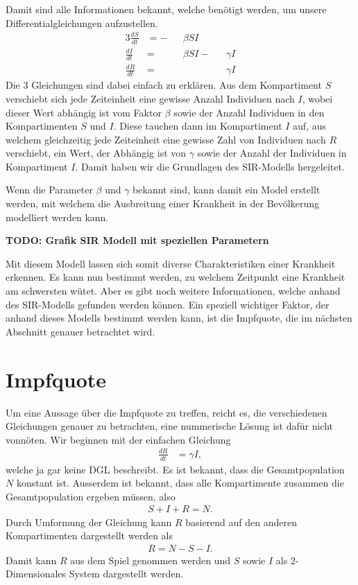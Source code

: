 \begin{refsection}
Damit sind alle Informationen bekannt, welche benötigt werden, um unsere Differentialgleichungen aufzustellen. 
\begin{alignat*}{3}
  \frac{dS}{dt} & = - && \beta S I  \\
  \frac{dI}{dt} & =   && \beta S I - && \gamma I \\
  \frac{dR}{dt} & =   &&             && \gamma I 
\end{alignat*}
Die 3 Gleichungen sind dabei einfach zu erklären. 
Aus dem Kompartiment $S$ verschiebt sich jede Zeiteinheit eine gewisse Anzahl Individuen nach $I$, wobei dieser Wert abhängig ist vom Faktor $\beta$ sowie der Anzahl Individuen in den Kompartimenten $S$ und $I$.
Diese tauchen dann im Kompartiment $I$ auf, aus welchem gleichzeitig jede Zeiteinheit eine gewisse Zahl von Individuen nach $R$ verschiebt, ein Wert, der Abhängig ist von $\gamma$ sowie der Anzahl der Individuen in Kompartiment $I$. 
Damit haben wir die Grundlagen des SIR-Modells hergeleitet. 

Wenn die Parameter $\beta$ und $\gamma$ bekannt sind, kann damit ein Model erstellt werden, mit welchem die Ausbreitung einer Krankheit in der Bevölkerung modelliert werden kann.

\textbf{TODO: Grafik SIR Modell mit speziellen Parametern}

Mit diesem Modell lassen sich somit diverse Charakteristiken einer Krankheit erkennen. 
Es kann nun bestimmt werden, zu welchem Zeitpunkt eine Krankheit am schwersten wütet. 
Aber es gibt noch weitere Informationen, welche anhand des SIR-Modells gefunden werden können.
Ein speziell wichtiger Faktor, der anhand dieses Modells bestimmt werden kann, ist die Impfquote, die im nächsten Abschnitt genauer betrachtet wird.

\section{Impfquote}
Um eine Aussage über die Impfquote zu treffen, reicht es, die verschiedenen Gleichungen genauer zu betrachten, eine nummerische Lösung ist dafür nicht vonnöten.
Wir beginnen mit der einfachen Gleichung
\begin{align*}
  \frac{dR}{dt} &= \gamma I,
\end{align*}
welche ja gar keine DGL beschreibt. 
Es ist bekannt, dass die Gesamtpopulation $N$ konstant ist. 
Ausserdem ist bekannt, dass alle Kompartimente zusammen die Gesamtpopulation ergeben müssen, also
\begin{align*}
  S + I + R = N.
\end{align*}
Durch Umformung der Gleichung kann $R$ basierend auf den anderen Kompartimenten dargestellt werden als
\begin{align*}
  R = N - S - I.
\end{align*}
Damit kann $R$ aus dem Spiel genommen werden und $S$ sowie $I$ als 2-Dimensionales System dargestellt werden.


\end{refsection}
